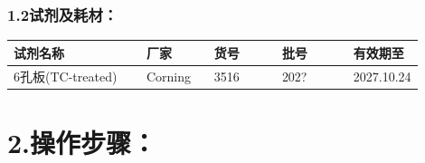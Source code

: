 \documentclass[UTF8,10pt,a4paper,fontset=fandol]{ctexart}
\newcommand{\fieldvalue}[1]{#1}
\newcommand{\handwritten}[1]{#1}
\begin{document}
\subsubsection*{1.2\quad 试剂及耗材：}

\begin{tabular}{|p{0.36\linewidth}|p{0.17\linewidth}|p{0.18\linewidth}|p{0.19\linewidth}|}
\hline
试剂名称 & 厂家 & 货号 & 批号 & 有效期至 \\
\hline
6孔板(TC-treated) &
\fieldvalue{Corning} &
\fieldvalue{3516} &
\fieldvalue{\handwritten{202?}} &
\fieldvalue{\handwritten{2027.10.24}} \\
\hline
\end{tabular}

\section*{2.\quad 操作步骤：}
\end{document}
